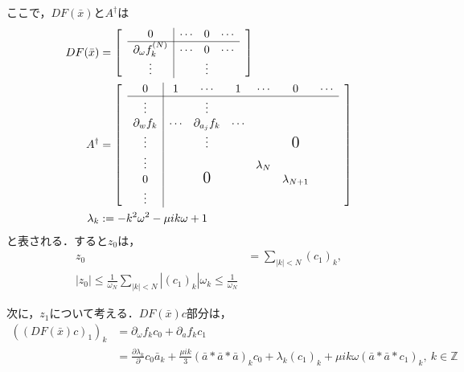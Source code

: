 \documentclass[11pt,a4paper]{jsarticle}
\theoremstyle{definition}
\begin{document}
ここで，$DF(\bar{x})とA^\dagger$は
\begin{align*}
  DF(\bar{x}) & = \begin{bmatrix}
                     & \multicolumn{0}{c|}{0}                         & \cdots & 0      & \cdots & \\ \cline{2-5}
                     & \multicolumn{1}{c|}{\partial_\omega f_k^{(N)}} & \cdots & 0      & \cdots & \\
                     & \multicolumn{1}{c|}{\vdots}                    &        & \vdots &        &
                  \end{bmatrix}                                         \\
  A^\dagger   & = \begin{bmatrix}
                     & \multicolumn{1}{c|}{0}              & 1      & \cdots            & 1      & \cdots    & 0                & \cdots & \\ \cline{2-8}
                     & \multicolumn{1}{c|}{\vdots}         &        & \vdots            &        &           &                  &        & \\
                     & \multicolumn{1}{c|}{\partial_w f_k} & \cdots & \partial_{a_j}f_k & \cdots &           &                  &          \\
                     & \multicolumn{1}{c|}{\vdots}         &        & \vdots            &        &           & \text{\Large{0}} &          \\
                     & \multicolumn{1}{c|}{\vdots}         &        &                   &        & \lambda_N &                  &        & \\
                     & \multicolumn{1}{c|}{0}              &        & \text{\Large{0}}  &        &           & \lambda_{N+1}    &          \\
                     & \multicolumn{1}{c|}{\vdots}         &        &                   &        &           &                  &
                  \end{bmatrix} \\
  \lambda_k   & := -k^2\omega^2 - \mu ik\omega + 1
\end{align*}
と表される．すると$z_0$は，
\begin{align*}
  z_0 & = \sum_{|k|<N} (c_1)_k, \\
  |z_0| \leq \frac{1}{\omega_N} \sum_{|k|<N} |(c_1)_k| \omega_k \leq \frac{1}{\omega_N}
\end{align*}

次に，$z_1$について考える．$DF(\bar{x})c$部分は，
\begin{equation*}
  \begin{split}
    \left(\left(DF(\bar{x})c\right)_1 \right)_k &= \partial_\omega f_k c_0 + \partial_a f_k c_1 \\
    &= \frac{\partial \lambda_k}{\partial} c_0 \bar{a}_k + \frac{\mu ik}{3} \left( \bar{a} * \bar{a} * \bar{a} \right)_k c_0 + \lambda_k (c_1)_k + \mu ik \omega \left( \bar{a} * \bar{a} * c_1 \right)_k,\ k \in \mathbb{Z}
  \end{split}
\end{equation*}
\end{document}
